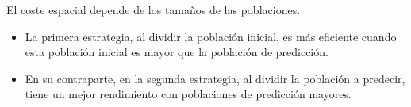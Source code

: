 		\vspace{-0.25cm}
		\begin{flushleft}
			El coste espacial depende de los tamaños de las poblaciones.		
		\end{flushleft}
		\vspace{-0.75cm}
		
		\begin{itemize}
			\item La primera estrategia, al dividir la población inicial, es más eficiente cuando esta población inicial es mayor que la población de predicción. 
			\item En su contraparte, en la segunda estrategia, al dividir la población a predecir, tiene un mejor rendimiento con poblaciones de predicción mayores.
		\end{itemize}
		
